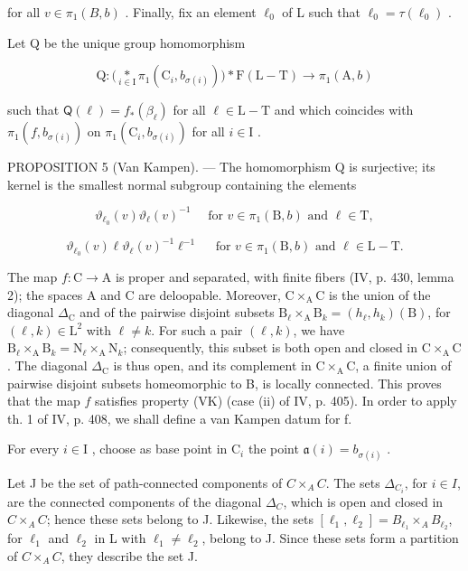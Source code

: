 for all \(v \in \pi_{1}(B, b)\) . Finally, fix an element \(\ell_{0}\) of L such that \(\ell_{0} = \tau(\ell_{0})\) .

Let Q be the unique group homomorphism

\[
\mathrm{Q} \colon \big (\underset {i \in \mathrm{I}} {*} \pi_ {1} (\mathrm{C} _ {i}, b _ {\sigma (i)}) \big) * \mathrm{F} (\mathrm{L} - \mathrm{T}) \to \pi_ {1} (\mathrm{A}, b)
\]

such that \(\mathsf{Q}(\ell) = f_{*}(\beta_{\ell})\) for all \(\ell \in \mathrm{L} - \mathrm{T}\) and which coincides with \(\pi_1(f, b_{\sigma(i)})\) on \(\pi_1(\mathrm{C}_i, b_{\sigma(i)})\) for all \(i \in \mathrm{I}\) .

PROPOSITION 5 (Van Kampen). --- The homomorphism Q is surjective; its kernel is the smallest normal subgroup containing the elements

\[
\vartheta_ {\ell_ {0}} (v) \vartheta_ {\ell} (v) ^ {- 1} \quad \text { for } v \in \pi_ {1} (\mathrm{B}, b) \text { and } \ell \in \mathrm{T},
\]

\[
\vartheta_ {\ell_ {0}} (v) \ell \vartheta_ {\ell} (v) ^ {- 1} \ell^ {- 1} \quad \text { for } v \in \pi_ {1} (\mathrm{B}, b) \text { and } \ell \in \mathrm{L} - \mathrm{T}.
\]

The map \(f \colon \mathrm{C} \to \mathrm{A}\) is proper and separated, with finite fibers (IV, p. 430, lemma 2); the spaces A and C are deloopable. Moreover, \(\mathrm{C} \times_{\mathrm{A}} \mathrm{C}\) is the union of the diagonal \(\Delta_{\mathrm{C}}\) and of the pairwise disjoint subsets \(\mathrm{B}_{\ell} \times_{\mathrm{A}} \mathrm{B}_{k} = (h_{\ell}, h_{k})(\mathrm{B})\), for \((\ell, k) \in \mathrm{L}^2\) with \(\ell \neq k\). For such a pair \((\ell, k)\), we have \(\mathrm{B}_{\ell} \times_{\mathrm{A}} \mathrm{B}_{k} = \mathrm{N}_{\ell} \times_{\mathrm{A}} \mathrm{N}_{k}\); consequently, this subset is both open and closed in \(\mathrm{C} \times_{\mathrm{A}} \mathrm{C}\). The diagonal \(\Delta_{\mathrm{C}}\) is thus open, and its complement in \(\mathrm{C} \times_{\mathrm{A}} \mathrm{C}\), a finite union of pairwise disjoint subsets homeomorphic to B, is locally connected. This proves that the map \(f\) satisfies property (VK) (case (ii) of IV, p. 405). In order to apply th. 1 of IV, p. 408, we shall define a van Kampen datum for f.

For every \(i \in \mathrm{I}\) , choose as base point in \(\mathrm{C}_i\) the point \(\mathfrak{a}(i) = b_{\sigma(i)}\) .

Let J be the set of path-connected components of \(C \times_{A} C\). The sets \(\Delta_{C_{i}}\), for \(i \in I\), are the connected components of the diagonal \(\Delta_{C}\), which is open and closed in \(C \times_{A} C\); hence these sets belong to J. Likewise, the sets \([\ell_{1}, \ell_{2}] = B_{\ell_{1}} \times_{A} B_{\ell_{2}}\), for \(\ell_{1}\) and \(\ell_{2}\) in L with \(\ell_{1} \neq \ell_{2}\), belong to J. Since these sets form a partition of \(C \times_{A} C\), they describe the set J.

